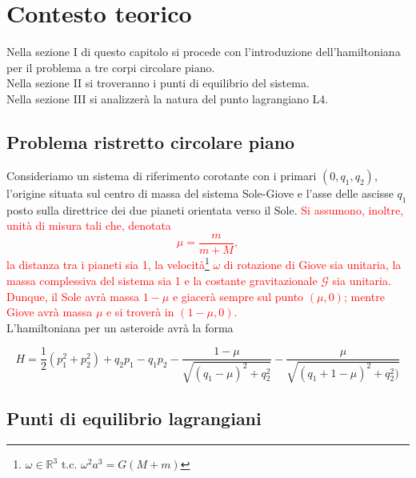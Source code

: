 \documentclass[a4paper,11pt,titlepage]{report}
\theoremstyle{definition}
\theoremstyle{plain}
\begin{document}
\chapter {Contesto teorico}
Nella sezione I di questo capitolo si procede con l'introduzione dell'hamiltoniana per il problema a tre corpi circolare piano.
\\Nella sezione II si troveranno i punti di equilibrio del sistema.
\\Nella sezione III si analizzerà la natura del punto lagrangiano L4.

\section {Problema ristretto circolare piano}

Consideriamo un sistema di riferimento corotante con i primari $ (0,q_1,q_2) $, l'origine situata sul centro di massa del sistema Sole-Giove e l'asse delle ascisse $ q_1 $ posto sulla direttrice dei due pianeti orientata verso il Sole.
\textcolor{red}{Si assumono, inoltre, unità di misura tali che, denotata $$\mu = \frac{m}{m+M}  ,$$ la distanza tra i pianeti sia 1, la velocità\footnote{$\omega \in \mathbb{R}^3$ t.c. $\omega^2a^3 = G(M+m)$} $\omega$ di rotazione di Giove sia unitaria, la massa complessiva del sistema sia 1 e la costante gravitazionale $\mathcal{G}$ sia unitaria. Dunque, il Sole avrà massa $ 1-\mu $ e giacerà sempre sul punto $(\mu,0)$; mentre Giove avrà massa $ \mu $ e si troverà in $ (1-\mu,0) $.}
\\L'hamiltoniana per un asteroide avrà la forma

\begin{equation}
\label{hamiltoniana1}
H = \frac{1}{2} ( p_1^2 + p_2^2) + q_2p_1 - q_1p_2 - \frac{1- \mu}{\sqrt{( q_1 - \mu )^2 +q_2^2 }} - \frac{\mu}{\sqrt{( q_1 + 1 - \mu )^2 +q_2^2 )}}
\end{equation}

\section {Punti di equilibrio lagrangiani}
\end{document}
